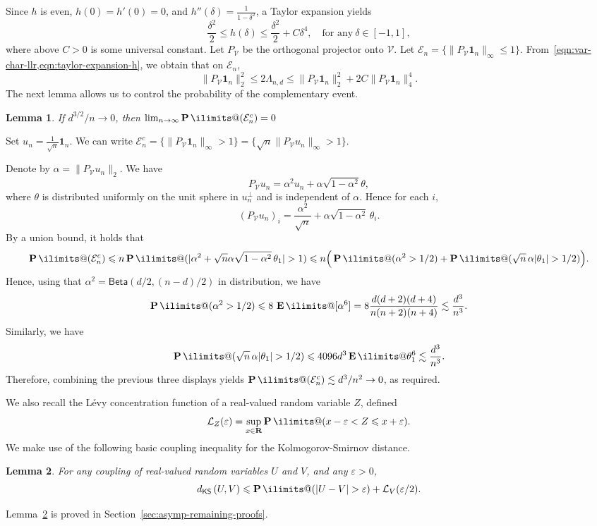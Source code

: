 \documentclass[11pt, letterpaper, hidelinks]{article}
\makeatletter
\renewcommand{\proofname}{\textit{\textbf{Proof}}}
\renewenvironment{proof}[1][\proofname]{\par\pushQED{\qed}\normalfont \topsep6\p@\@plus6\p@\relax\trivlist\item[\hskip\labelsep#1\@addpunct{}]\ignorespaces}{\popQED\endtrivlist\@endpefalse}
\newcommand{\R}{\mathbf R}
\newcommand{\cE}{\mathcal{E}}
\newcommand{\cL}{\mathcal{L}}
\newcommand{\cV}{\mathcal{V}}
\newcommand{\1}{\mathbf 1}
\newcommand{\eps}{\varepsilon}
\renewcommand{\le}{\leqslant}
\renewcommand{\leq}{\leqslant}
\newcommand{\E}{\operatorname*{\mathbf{E}}\ilimits@}
\renewcommand{\P}{\operatorname*{\mathbf{P}}\ilimits@}
\theoremstyle{plain}
\newtheorem{lemma}{Lemma}[section]
\theoremstyle{definition}
\newcommand{\defn}{=}
\newcommand{\KSDist}[2]{d_{\mathsf{KS}}\left(#1, #2\right)}
\makeatother
\begin{document}
Since $h$ is even, $h(0)=h'(0)=0$, and
$h''(\delta)=\frac{1}{1-\delta^2}$, a Taylor expansion yields 
\begin{equation}\label{eqn:taylor-expansion-h}
\frac{\delta^2}{2}\leq h(\delta) \leq \frac{\delta^2}{2} + C \delta^4, \quad \mbox{for any}~\delta \in [-1, 1],
\end{equation}
where above $C > 0$ is some universal constant. 
Let $P_{\cV}$ be the orthogonal projector onto $\cV$. Let $\cE_n = \{\|P_\cV \mathbf{1}_n\|_\infty \leq 1\}$. 
From~\cref{eqn:var-char-llr,eqn:taylor-expansion-h}, we obtain that on $\cE_n$, 
\begin{equation}
\label{eq:chi-limit-upper-det}
\|P_{\cV} \mathbf{1}_n\|_2^2 \leq 2 \Lambda_{n,d} \leq \|P_{\cV} \mathbf{1}_n\|_2^2  + 2C \|P_{\cV} \mathbf{1}_n\|_4^4.
\end{equation}
The next lemma allows us to control the probability of the complementary event.
\begin{lemma}
\label{lemma:the-bad-event-has-small-probability}
If $d^{3/2}/n \to 0$, then $\lim_{n \to \infty} \P(\cE_n^c)= 0$
\end{lemma}
\begin{proof}
Set $u_n = \tfrac{1}{\sqrt{n}} \1_n$. We can write $\cE_n^c = \{\|P_\cV \1_n\|_\infty > 1\} = \{\sqrt{n}\|P_\cV u_n\|_\infty > 1\}$.

Denote by $\alpha = \|P_\cV u_n\|_2$. We have 
\[
P_\cV u_n = \alpha^2 u_n + \alpha \sqrt{1 - \alpha^2} \theta, 
\]
where $\theta$ is distributed uniformly on the unit sphere in $u_n^\perp$ and is independent of $\alpha$. Hence for each $i$,
\[
(P_\cV u_n)_i=\frac{\alpha^2}{\sqrt{n}} + \alpha\sqrt{1-\alpha^2}\,\theta_i.
\]
By a union bound, it holds that 
\[
\P(\cE_n^c) \leq n \P( |\alpha^2 + \sqrt{n} \alpha\sqrt{1-\alpha^2}\,\theta_1| > 1) 
\leq  n\Big(\P(\alpha^2>1/2)
+\P(\sqrt n\,\alpha|\theta_1|>1/2)\Big).
\]
Hence, using that $\alpha^2 = \mathsf{Beta}(d/2, (n-d)/2)$ in distribution, we have 
\[
\P(\alpha^2>1/2)\leq 8\, \E[\alpha^6] = 8 \frac{d(d+2)(d+4)}{n(n+2)(n+4)} \lesssim \frac{d^3}{n^3}.
\]
Similarly, we have 
\[
\P(\sqrt n\,\alpha|\theta_1|>1/2) \leq 4096 d^3 \E \theta_1^6 \lesssim \frac{d^3}{n^3}. 
\]
Therefore, combining the previous three displays yields $\P(\cE_n^c) \lesssim d^3/n^2 \to 0$, as required.
\end{proof}

We also recall the Lévy concentration function of a real-valued random variable $Z$, defined 
\[
\cL_Z(\eps) \defn \sup_{x\in \R}\P(x-\eps<Z\leq x+\eps).
\]
We make use of the following basic coupling inequality for the Kolmogorov-Smirnov distance.
\begin{lemma}
\label{lem:ks-coupling}
For any coupling of real-valued random variables $U$ and $V$, and any $\eps>0$,
\begin{equation}
\label{eq:chi-limit-ks-basic}
\KSDist{U}{V}
\le
\P(|U-V|>\eps)
+
\cL_V(\eps/2).
\end{equation}
\end{lemma}
Lemma~\ref{lem:ks-coupling} is proved in Section~\ref{sec:asymp-remaining-proofs}.
\end{document}

